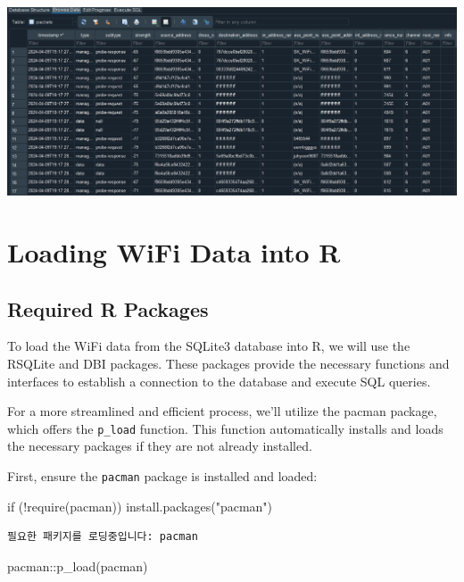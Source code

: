 \documentclass[
  letterpaper,
]{scrbook}
\newenvironment{Shaded}{\begin{snugshade}}{\end{snugshade}}
\newcommand{\ControlFlowTok}[1]{\textcolor[rgb]{0.00,0.23,0.31}{#1}}
\newcommand{\FunctionTok}[1]{\textcolor[rgb]{0.28,0.35,0.67}{#1}}
\newcommand{\NormalTok}[1]{\textcolor[rgb]{0.00,0.23,0.31}{#1}}
\newcommand{\SpecialCharTok}[1]{\textcolor[rgb]{0.37,0.37,0.37}{#1}}
\newcommand{\StringTok}[1]{\textcolor[rgb]{0.13,0.47,0.30}{#1}}
\begin{document}
\includegraphics{content/material/ch3/sqlite3_browser.png}

\hypertarget{loading-wifi-data-into-r}{%
\section{Loading WiFi Data into R}\label{loading-wifi-data-into-r}}

\hypertarget{required-r-packages}{%
\subsection{Required R Packages}\label{required-r-packages}}

To load the WiFi data from the SQLite3 database into R, we will use the
RSQLite and DBI packages. These packages provide the necessary functions
and interfaces to establish a connection to the database and execute SQL
queries.

For a more streamlined and efficient process, we'll utilize the pacman
package, which offers the \texttt{p\_load} function. This function
automatically installs and loads the necessary packages if they are not
already installed.

First, ensure the \texttt{pacman} package is installed and loaded:

\begin{Shaded}
\begin{Highlighting}[]
\ControlFlowTok{if}\NormalTok{ (}\SpecialCharTok{!}\FunctionTok{require}\NormalTok{(pacman)) }\FunctionTok{install.packages}\NormalTok{(}\StringTok{"pacman"}\NormalTok{)}
\end{Highlighting}
\end{Shaded}

\begin{verbatim}
필요한 패키지를 로딩중입니다: pacman
\end{verbatim}

\begin{Shaded}
\begin{Highlighting}[]
\NormalTok{pacman}\SpecialCharTok{::}\FunctionTok{p\_load}\NormalTok{(pacman)}
\end{Highlighting}
\end{Shaded}
\end{document}
